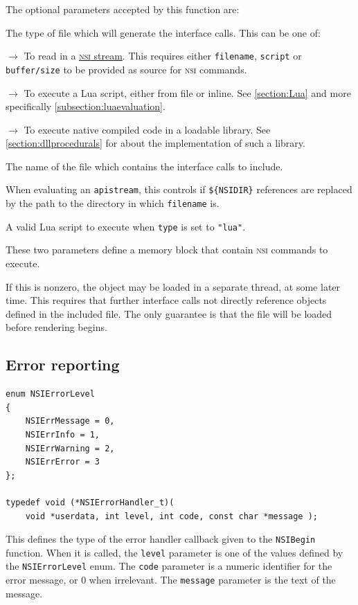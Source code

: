 \documentclass[oneside,ebook]{memoir}
\newcommand*{\acronym}[1]{\textsc{\lowercase{#1}}}
\newcommand{\paramlistitemN}[1]{\item[#1]}
\newcommand{\paramlistitemTN}[2]{\item[#2\textcolor{lightgray}{\dotfill}#1]}
\newcommand{\paramlistitemTND}[3]{\paramlistitemTN{#1 {\rmfamily({\ttfamily#3})}}{#2}}
\newcommand{\paramlistitems}[1]{{
	\renewcommand{\paramlistitemN}[1]{##1\newline}
	\renewcommand{\paramlistitemTN}[2]{##2\textcolor{lightgray}{\dotfill}##1\newline}
	\renewcommand{\paramlistitemTND}[3]{\paramlistitemTN{##1 {\rmfamily({\ttfamily##3})}}{##2}}
	\item[\parbox{\textwidth}{#1}]
}}
\newcommand{\paramvalueitem}[1]{\item[#1]$\rightarrow$}
\begin{document}
The optional parameters accepted by this function are:
\begin{paramlist}
\paramlistitemTN{string}{type}
The type of file which will generate the interface calls. This can be one of:
\begin{paramvaluelist}
\paramvalueitem{apistream}
To read in a \hyperref[section:nsistream]{\acronym{NSI} stream}. This requires either \lstinline|filename|, \lstinline|script| or \lstinline|buffer/size| to be provided as source for \acronym{NSI} commands.
\paramvalueitem{lua}
To execute a Lua script, either from file or inline. See \autoref{section:Lua} and more specifically \autoref{subsection:luaevaluation}.
\paramvalueitem{dynamiclibrary}
To execute native compiled code in a loadable library.
See \autoref{section:dllprocedurals} for about the implementation of such a library.
\end{paramvaluelist}
\paramlistitemTN{string}{filename}
The name of the file which contains the interface calls to include.
\paramlistitemTND{int}{replacensidir}{1}
When evaluating an \lstinline|apistream|, this controls if \lstinline|${NSIDIR}| references are replaced by the path to the directory in which \lstinline|filename| is.
\paramlistitemTN{string}{script}
A valid Lua script to execute when \lstinline|type| is set to \lstinline|"lua"|.
\paramlistitems{
	\paramlistitemTN{pointer}{buffer}
	\paramlistitemTN{int64}{size}
}
These two parameters define a memory block that contain \acronym{NSI} commands to execute.
\paramlistitemTND{int}{backgroundload}{0}
If this is nonzero, the object may be loaded in a separate thread, at some later time. This requires that further interface calls not directly reference objects defined in the included file. The only guarantee is that the file will be loaded before rendering begins.
\end{paramlist}

\subsection{Error reporting}
\label{subsection:errors}
\begin{lstlisting}[style=CAPI]
enum NSIErrorLevel
{
	NSIErrMessage = 0,
	NSIErrInfo = 1,
	NSIErrWarning = 2,
	NSIErrError = 3
};

typedef void (*NSIErrorHandler_t)(
	void *userdata, int level, int code, const char *message );
\end{lstlisting}
This defines the type of the error handler callback given to the \lstinline|NSIBegin| function. When it is called, the \lstinline|level| parameter is one of the values defined by the \lstinline|NSIErrorLevel| enum. The \lstinline|code| parameter is a numeric identifier for the error message, or 0 when irrelevant. The \lstinline|message| parameter is the text of the message.
\end{document}
